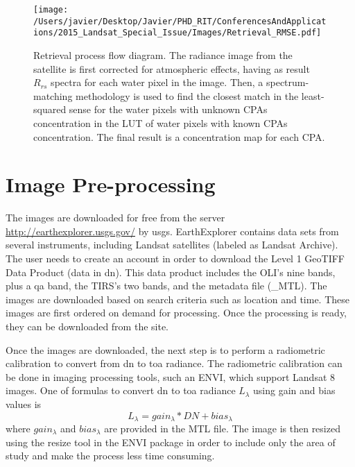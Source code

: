 \begin{figure}[htb]
  \centering
    \texttt{[image: /Users/javier/Desktop/Javier/PHD\_RIT/ConferencesAndApplications/2015\_Landsat\_Special\_Issue/Images/Retrieval\_RMSE.pdf]}
    \caption{Retrieval process flow diagram. The radiance image from the satellite is first corrected for atmospheric effects, having as result $R_{rs}$ spectra for each water pixel in the image. Then, a spectrum-matching methodology is used to find the closest match in the least-squared sense for the water pixels with unknown CPAs concentration in the LUT of water pixels with known CPAs concentration. The final result is a concentration map for each CPA.  \label{fig:retrieval} }
\end{figure}
\section{Image Pre-processing} 
\label{sec:prepro}

The images are downloaded for free from the server \url{http://earthexplorer.usgs.gov/} by \gls{usgs}. EarthExplorer contains data sets from several instruments, including Landsat satellites (labeled as Landsat Archive). The user needs to create an account in order to download the Level 1 GeoTIFF Data Product (data in \gls{dn}). This data product includes the OLI's nine bands, plus a \gls{qa} band, the TIRS's two bands, and the metadata file (\_MTL). The images are downloaded based on search criteria such as location and time. These images are first ordered on demand for processing. Once the processing is ready, they can be downloaded from the site.

Once the images are downloaded, the next step is to perform a radiometric calibration to convert from \gls{dn} to \gls{toa} radiance. The radiometric calibration can be done in imaging processing tools, such an ENVI, which support Landsat 8 images. One of formulas to convert \gls{dn} to \gls{toa} radiance $L_{\lambda}$ using gain and bias values is
\begin{equation}
  L_{\lambda} = gain_{\lambda}*DN+bias_{\lambda}
\end{equation}
\noindent where $gain_{\lambda}$ and $bias_{\lambda}$ are provided in the MTL file. The image is then resized using the resize tool in the ENVI package in order to include only the area of study and make the process less time consuming.

